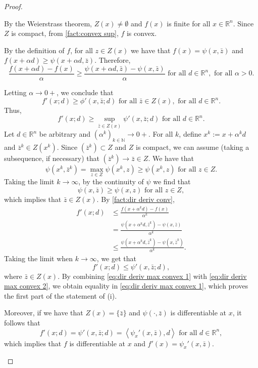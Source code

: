 \documentclass[smallextended,numbook,nospthms]{svjour3}
\theoremstyle{plain}
\theoremstyle{definition}
\def\RR{\mathds R}
\def\NN{\mathds N}
\newcommand{\scal}[2]{\left\langle{#1},{#2}  \right\rangle}
\begin{document}
\begin{proof}
	\begin{listi}
		\item By the Weierstrass theorem, $Z(x)\not=\emptyset$ and $f(x)$ is finite for all $x \in \RR^n$. Since $Z$ is compact, from \cref{fact:convex sup}, $f$ is convex.
		
		By the definition of $f$, for all $z \in Z(x)$ we have that $f(x)=\psi(x,\bar{z})$ and $f(x+\alpha d)\geq \psi(x+\alpha d, \bar{z})$. Therefore,
		\[
		\frac{f(x+\alpha d)-f(x)}{\alpha} \geq \frac{\psi(x+\alpha d, \bar{z})-\psi(x,\bar{z})}{\alpha} \text{ for all } d \in \RR^n, \text{ for all } \alpha > 0.
		\]
		
		Letting $\alpha \rightarrow 0+$, we conclude that
		\[
		f'(x;d) \geq \phi'(x,\bar{z};d) \text{ for all } \bar{z} \in Z(x), \text{ for all } d \in \RR^n.
		\]
		Thus,
		\[
		f'(x;d) \geq \sup_{\bar{z} \in Z(x)} \psi'(x,\bar{z};d) \text{ for all } d \in \RR^n. \label{eq:dir deriv max convex 1}
		\]
		Let $d \in \RR^n$ be arbitrary and $(\alpha^k)_{k \in \NN} \rightarrow 0+$. For all $k$, define $x^k:=x+\alpha^k d$ and $\bar{z}^k \in Z(x^k)$. Since $(\bar{z}^k) \subset Z$ and $Z$ is compact, we can assume (taking a subsequence, if necessary) that $(\bar{z}^k) \rightarrow \bar{z} \in Z$.
		We have that
		\[
		\psi(x^k,\bar{z}^k)=\max_{z \in Z} \psi(x^k,z) \geq \psi(x^k,z) \text{ for all } z \in Z.
		\]
		Taking the limit $k \rightarrow \infty$, by the continuity of $\psi$ we find that
		\[
		\psi(x,\bar{z}) \geq \psi(x,z) \text{ for all } z \in Z,
		\]	
		which implies that $\bar{z} \in Z(x)$. By \cref{fact:dir deriv conv},
		\begin{align}
			f'(x;d) &\leq \frac{f(x+\alpha^k d)-f(x)}{\alpha^k} \\
					&= \frac{\psi(x+\alpha^k d, \bar{z}^k)-\psi(x,\bar{z})}{\alpha^k} \\
					&\leq \frac{\psi(x+\alpha^k d, \bar{z}^k)-\psi(x,\bar{z}^k)}{\alpha^k}.
		\end{align}
		Taking the limit when $k \rightarrow \infty$, we get that
		\[
		f'(x;d) \leq \psi'(x,\bar{z};d), \label{eq:dir deriv max convex 2}
		\]
		where $\bar{z} \in Z(x)$. By combining \cref{eq:dir deriv max convex 1} with \cref{eq:dir deriv max convex 2}, we obtain equality in \cref{eq:dir deriv max convex 1}, which proves the first part of the statement of (i).
		
		Moreover, if we have that $Z(x)=\{\bar{z}\}$ and $\psi(\cdot,\bar{z})$ is differentiable at $x$, it follows that
		\[
		f'(x;d)=\psi'(x,\bar{z};d)=\scal{\psi_{x}'(x,\bar{z})}{d} \text{ for all } d \in \RR^n,
		\]
		which implies that $f$ is differentiable at $x$ and  $f'(x)=\psi_{x}'(x,\bar{z})$.
		

\end{listi}
\end{proof}
\end{document}
